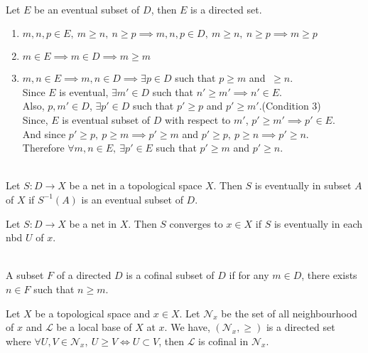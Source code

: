 \begin{remark}\cite[10.1.6]{joshi}\\
	Let $E$ be an eventual subset of $D$, then $E$ is a directed set.
	\begin{enumerate}
		\item $m,n,p \in E,\ m \ge n,\ n \ge p \implies m,n,p \in D,\ m \ge n,\ n \ge p \implies m \ge p$
		\item $m \in E \implies m \in D \implies m \ge m$
		\item $m,n \in E \implies m,n \in D \implies \exists p \in D$ such that $p \ge m$ and $\ \ge n$.\\
			Since $E$ is eventual, $\exists m' \in D$ such that $n' \ge m' \implies n' \in E$.\\
			Also, $p,m' \in D$, $\exists p' \in D$ such that $p' \ge p$ and $p' \ge m'$.(Condition 3)\\
			Since, $E$ is eventual subset of $D$ with respect to $m'$, $p' \ge m' \implies p' \in E$.\\
			And since $p' \ge p,\ p \ge m \implies p' \ge m$ and $p' \ge p,\ p \ge n \implies p' \ge n$.\\
			Therefore $\forall m,n \in E,\ \exists p' \in E$ such that $p' \ge m$ and $p' \ge n$.
	\end{enumerate}
\end{remark}

\begin{definition}\cite[10.1.5]{joshi}\\
	Let $S : D \to X$ be a net in a topological space $X$. Then $S$ is eventually in subset $A$ of $X$ if $S^{-1}(A)$ is an eventual subset of $D$.
\end{definition}

\begin{remark}
	Let $S : D \to X$ be a net in $X$. Then $S$ converges to $x \in X$ if $S$ is eventually in each nbd $U$ of $x$.
\end{remark}

\begin{definition}\cite[10.1.7]{joshi}\\
	A subset $F$ of a directed $D$ is a cofinal subset of $D$ if for any $m \in D$, there exists $n \in F$ such that $n \ge m$.
\end{definition}

\begin{remark}
	Let $X$ be a topological space and $x \in X$. Let $\mathcal{N}_x$ be the set of all neighbourhood of $x$ and $\mathcal{L}$ be a local base of $X$ at $x$. We have, $(\mathcal{N}_x,\ge)$ is a directed set where $\forall U,V \in \mathcal{N}_x,\ U \ge V \iff U \subset V$, then $\mathcal{L}$ is cofinal in $\mathcal{N}_x$.
\end{remark}

